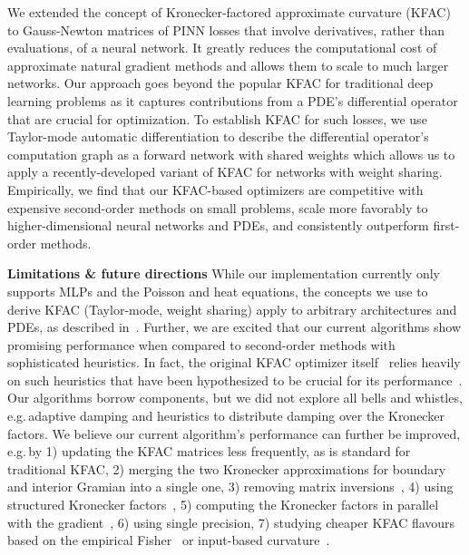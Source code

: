 We extended the concept of Kronecker-factored approximate curvature (KFAC) to Gauss-Newton matrices of PINN losses that involve derivatives, rather than evaluations, of a neural network.
It greatly reduces the computational cost of approximate natural gradient methods and allows them to scale to much larger networks.
Our approach goes beyond the popular KFAC for traditional deep learning problems as it captures contributions from a PDE's differential operator that are crucial for optimization.
To establish KFAC for such losses, we use Taylor-mode automatic differentiation to describe the differential operator's computation graph as a forward network with shared weights which allows us to apply a recently-developed variant of KFAC for networks with weight sharing.
Empirically, we find that our KFAC-based optimizers are competitive with expensive second-order methods on small problems, scale more favorably to higher-dimensional neural networks and PDEs, and consistently outperform first-order methods.

\textbf{Limitations \& future directions} While our implementation currently only supports MLPs and the Poisson and heat equations, the concepts we use to derive KFAC (Taylor-mode, weight sharing) apply to arbitrary architectures and PDEs, as described in~.
Further, we are excited that our current algorithms show promising performance when compared to second-order methods with sophisticated heuristics.
In fact, the original KFAC optimizer itself~\cite{martens2015optimizing} relies heavily on such heuristics that have been hypothesized to be crucial for its performance~\cite{clarke2023adam}.
Our algorithms borrow components, but we did not explore all bells and whistles, e.g.\,adaptive damping and heuristics to distribute damping over the Kronecker factors.
We believe our current algorithm's performance can further be improved, e.g.\,by 1) updating the KFAC matrices less frequently, as is standard for traditional KFAC, 2) merging the two Kronecker approximations for boundary and interior Gramian into a single one, 3) removing matrix inversions~\cite{lin2023simplifying}, 4) using structured Kronecker factors~\cite{lin2023structured}, 5) computing the Kronecker factors in parallel with the gradient~\cite{dangel2020backpack}, 6) using single precision, 7) studying cheaper KFAC flavours based on the empirical Fisher~\cite{kunstner2019limitations} or input-based curvature~\cite{benzing2022gradient,petersen2023isaac}.